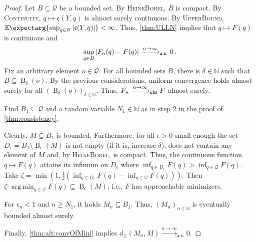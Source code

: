 \documentclass{scrartcl}
\renewcommand{\subset}{\subseteq}
\DeclareMathOperator{\ball}{\mathrm{B}}
\newcommand{\Ex}{\E\expectarg}
\newcommand*{\mc}[1]{\mathcal{#1}}
\newcommand*{\ms}[1]{\mathsf{#1}}
\newcommand*{\mf}[1]{\mathfrak{#1}}
\newcommand{\N}{\mathbb{N}}
\newcommand{\equationFullstop}{\, .}
\newcommand{\eqfs}{\equationFullstop}
\DeclareMathOperator*{\argmin}{arg\,min}
\theoremstyle{plain}\newtheorem{theorem}{Theorem}[section]
\theoremstyle{definition}
\theoremstyle{remark}
\begin{document}
\begin{appendix}
\begin{proof}
Let $B\subset\mc Q$ be a bounded set.
By \textsc{HeineBorel}, $\overline{B}$ is compact.
By \textsc{Continuity}, $q \mapsto \mf c(Y, q)$ is almost surely continuous.
By \textsc{UpperBound}, $\Ex{ \sup_{q\in B}\abs{\mf c(Y, q)}} < \infty$. Thus, \autoref{thm:ULLN} implies that $q \mapsto F(q)$ is continuous and
\begin{equation*}
	\sup_{q\in B}  \abs{F_n(q)-F(q)} \xrightarrow{n\to\infty}_{\ms{a.s.}}0
	\eqfs
\end{equation*}
Fix an arbitrary element $o\in\mc Q$. For all bounded sets $B$, there is $\delta \in\N$ such that $B \subset \ball_\delta(o)$. By the previous considerations, uniform convergence holds almost surely for all $(\ball_{\delta}(o))_{\delta\in\N}$.
Thus, $F_n \xrightarrow{n\to\infty}_{\mathsf{ubs}} F$ almost surely.

\noindent
\underline{}
Find $B_1\subset\mc Q$ and a random variable $N_1\in\N$ as in step 2 in the proof of \autoref{thm:consistency}.

\noindent
\underline{}
Clearly, $M \subset B_1$ is bounded. Furthermore, for all $\epsilon > 0$ small enough the set $D_\epsilon = \overline{B_1 \setminus \ball_\epsilon(M)}$ is not empty (if it is, increase $\delta$), does not contain any element of $M$ and, by \textsc{HeineBorel}, is compact. Thus, the continuous function $q\mapsto F(q)$ attains its infimum on $D_\epsilon$ where $\inf_{q\in D_\epsilon} F(q) > \inf_{q\in \mc Q} F(q)$. Take $\zeta = \min(1, \frac{1}{2}(\inf_{q\in D_\epsilon} F(q) - \inf_{q\in \mc Q} F(q)))$. Then $\zeta\text{-}\argmin_{q\in\mc Q} F(q) \subset \ball_\epsilon(M)$, i.e., $F$ has approachable minimizers. 

\noindent
\underline{}
For $\epsilon_n < 1$ and $n \geq N_1$, it holds $M_n \subset B_1$. Thus, $(M_n)_{n\in\N}$ is eventually bounded almost surely.

\noindent
\underline{}
Finally, \autoref{thm:alt:convOfMini} implies $d_\subset(M_n, M) \xrightarrow{n\to\infty}_{\ms{a.s.}} 0$.
\end{proof}

\end{appendix}
\end{document}
